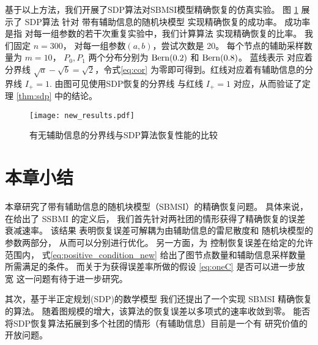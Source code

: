 基于以上方法，我们开展了SDP算法对SBMSI模型精确恢复的仿真实验。
图 \ref{fig:my_label} 展示了 SDP算法
针对 带有辅助信息的随机块模型 实现精确恢复的成功率。
成功率是指 对每一组参数的若干次重复实验中，我们计算算法
实现精确恢复的比率。
我们固定 $n=300$， 对每一组参数$(a,b)$，尝试次数是 20。
每个节点的辅助采样数量为 $m=10$，
$P_0,P_1$ 两个分布分别为 $\operatorname{Bern}(0.2)$ 和 $\operatorname{Bern}(0.8)$。
蓝线表示 对应着分界线 $\sqrt{a}-\sqrt{b}=\sqrt{2}$，令式\eqref{eq:cor}
为零即可得到。红线对应着有辅助信息的分界线 $I_+ = 1$.
由图可见使用SDP恢复的分界线 与红线 $I_+ = 1$ 对应，从而验证了定理
\ref{thm:sdp} 中的结论。
\begin{figure}[!ht]
    \centering
    \texttt{[image: new\_results.pdf]}
    \caption{有无辅助信息的分界线与SDP算法恢复性能的比较}
    \label{fig:my_label}
\end{figure}

\section{本章小结}
本章研究了带有辅助信息的随机块模型（SBMSI）的精确恢复问题。
具体来说，在给出了 SSBMI 的定义后， 
我们首先针对两社团的情形获得了精确恢复的误差衰减速率。
该结果
表明恢复误差可解耦为由辅助信息的雷尼散度和
随机块模型的参数两部分，
从而可以分别进行优化。
另一方面，为
控制恢复误差在给定的允许范围内，
式\eqref{eq:positive_condition_new}
给出了图节点数量和辅助信息采样数量所需满足的条件。
而关于为获得误差率所做的假设 \eqref{eq:oneC} 是否可以进一步放宽
这一问题有待于进一步研究。

其次，基于半正定规划(SDP)的数学模型
我们还提出了一个实现 SBMSI 精确恢复的算法。
随着图规模的增大，该算法的恢复误差以多项式的速率收敛到零。
能否将SDP恢复算法拓展到多个社团的情形（有辅助信息）目前是一个有
研究价值的开放问题。
